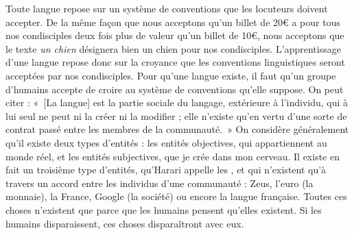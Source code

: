 {     Toute langue repose sur un système de conventions que les locuteurs doivent accepter. De la même façon que nous acceptons qu’un billet de 20€ a pour tous nos condisciples deux fois plus de valeur qu’un billet de 10€, nous acceptons que le texte \textit{un chien} désignera bien un chien pour nos condisciples. L’apprentissage d’une langue repose donc sur la croyance que les conventions linguistiques seront acceptées par nos condisciples. Pour qu’une langue existe, il faut qu’un groupe d’humains accepte de croire au système de conventions qu’elle suppose. On peut citer \citet[31]{saussure1916cours} : «~[La langue] est la partie sociale du langage, extérieure à l’individu, qui à lui seul ne peut ni la créer ni la modifier ; elle n’existe qu’en vertu d’une sorte de contrat passé entre les membres de la communauté.~» On considère généralement qu’il existe deux types d’entités : les entités objectives, qui appartiennent au monde réel, et les entités subjectives, que je crée dans mon cerveau. Il existe en fait un troisième type d’entités, qu’Harari appelle les , et qui n’existent qu’à travers un accord entre les individus d’une communauté : Zeus, l’euro (la monnaie), la France, Google (la société) ou encore la langue française. Toutes ces choses n’existent que parce que les humains pensent qu’elles existent. Si les humains disparaissent, ces choses disparaîtront avec eux.
}
